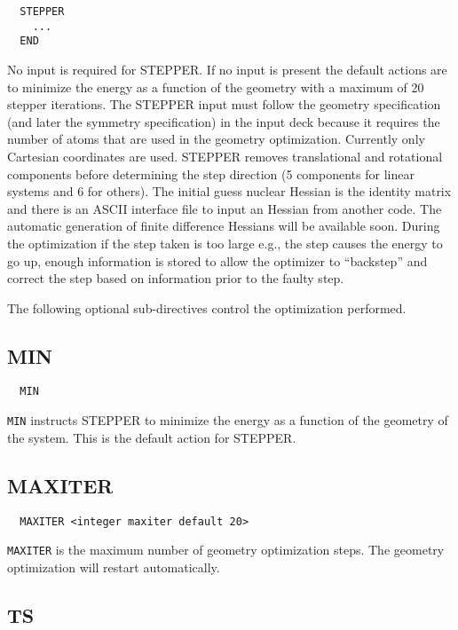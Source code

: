 \label{sec:stepper}

\begin{verbatim}
  STEPPER
    ...
  END
\end{verbatim}
  No input is required for STEPPER.  If no input is present the
default actions are to minimize the energy as a function of the
geometry with a maximum of 20 stepper iterations.  The STEPPER input
must follow the geometry specification (and later the symmetry
specification) in the input deck because it requires the number of
atoms that are used in the geometry optimization.  Currently only
Cartesian coordinates are used.  STEPPER removes translational and
rotational components before determining the step direction (5
components for linear systems and 6 for others).  The initial guess
nuclear Hessian is the identity matrix and there is an ASCII interface
file to input an Hessian from another code.  The automatic generation
of finite difference Hessians will be available soon.  During the
optimization if the step taken is too large e.g., the step causes the
energy to go up, enough information is stored to allow the optimizer
to ``backstep'' and correct the step based on information prior to the
faulty step.

 The following optional sub-directives control the optimization
performed.

\subsection{MIN}

\begin{verbatim}
  MIN
\end{verbatim}

\verb+MIN+ instructs STEPPER to minimize the energy as a function of the
geometry of the system. This is the default action for STEPPER.

\subsection{MAXITER}

\begin{verbatim}
  MAXITER <integer maxiter default 20>
\end{verbatim}

\verb+MAXITER+ is the maximum number of geometry optimization steps.  The
geometry optimization will restart automatically.

\subsection{TS}

